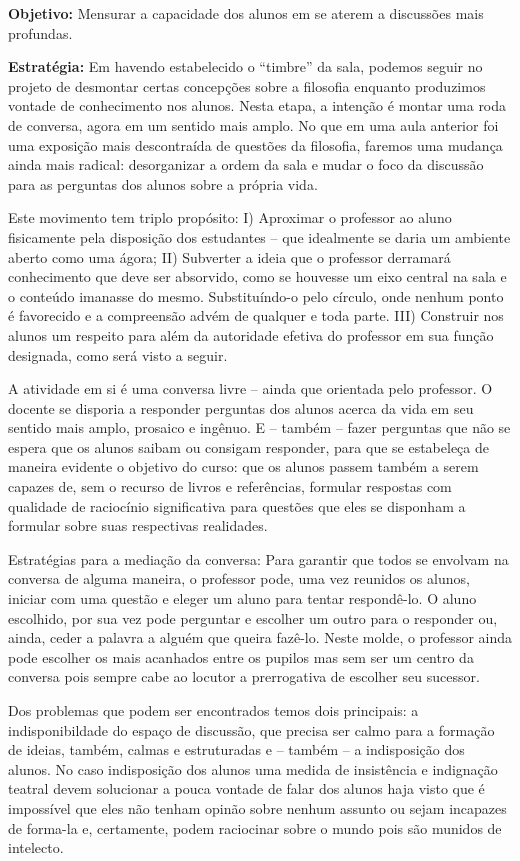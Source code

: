 \documentclass[12pt,a4paper]{article}
\begin{document}
	\textbf{Objetivo:} Mensurar a capacidade dos alunos em se 
	aterem a discussões mais profundas. 

	\textbf{Estratégia:}
	Em havendo estabelecido o “timbre” da sala, podemos seguir no 
	projeto de desmontar certas concepções sobre a filosofia 
	enquanto produzimos vontade de conhecimento nos alunos. Nesta
	etapa, a intenção é montar uma roda de conversa, agora 
	em um sentido mais amplo. No que em uma aula anterior foi uma 
	exposição mais descontraída de questões da filosofia, faremos 
	uma mudança ainda mais radical: desorganizar a ordem da sala e 
	mudar o foco da discussão para as perguntas dos alunos sobre 
	a própria vida. 

	Este movimento tem triplo propósito: I) Aproximar o 
	professor ao aluno fisicamente pela disposição dos 
	estudantes -- que idealmente se daria um ambiente aberto como 
	uma ágora; II) Subverter a ideia que o professor 
	derramará conhecimento que deve ser absorvido, como se houvesse
	um eixo central na sala e o conteúdo imanasse do mesmo. 
	Substituíndo-o pelo círculo, onde nenhum ponto é favorecido e 
	a compreensão advém de qualquer e toda parte. III) 
	Construir nos alunos um respeito para além da autoridade efetiva
	do professor em sua função designada, como será visto a seguir.

	A atividade em si é uma conversa livre -- ainda que orientada 
	pelo professor. O docente se disporia a responder perguntas dos 
	alunos acerca da vida em seu sentido mais amplo, prosaico e 
	ingênuo. E -- também -- fazer perguntas que não se espera que 
	os alunos saibam ou consigam responder, para que se estabeleça 
	de maneira evidente o objetivo do curso: que os alunos passem 
	também a serem capazes de, sem o recurso de livros e referências,
	formular respostas com qualidade de raciocínio significativa 
	para questões que eles se disponham a formular sobre suas 
	respectivas realidades.
	
	Estratégias para a mediação da conversa: Para garantir que todos 
	se envolvam na conversa de alguma maneira, o professor pode, uma 
	vez reunidos os alunos, iniciar com uma questão e eleger um aluno 
	para tentar respondê-lo. O aluno escolhido, por sua vez pode 
	perguntar e escolher um outro para o responder ou, ainda, ceder a 
	palavra a alguém que queira fazê-lo. Neste molde, o professor 
	ainda pode escolher os mais acanhados entre os pupilos mas sem 
	ser um centro da conversa pois sempre cabe ao locutor a 
	prerrogativa de escolher seu sucessor.
	
	Dos problemas que podem ser encontrados temos dois principais:
	a indisponibildade do espaço de discussão, que precisa ser calmo 
	para a formação de ideias, também, calmas e estruturadas e -- 
	também -- a indisposição dos alunos. No caso indisposição dos 
	alunos uma medida de insistência e indignação teatral devem 
	solucionar a pouca vontade de falar dos alunos haja visto que é 
	impossível que eles não tenham opinão sobre nenhum assunto ou 
	sejam incapazes de forma-la e, certamente, podem raciocinar sobre 
	o mundo pois são munidos de intelecto.
\end{document}
